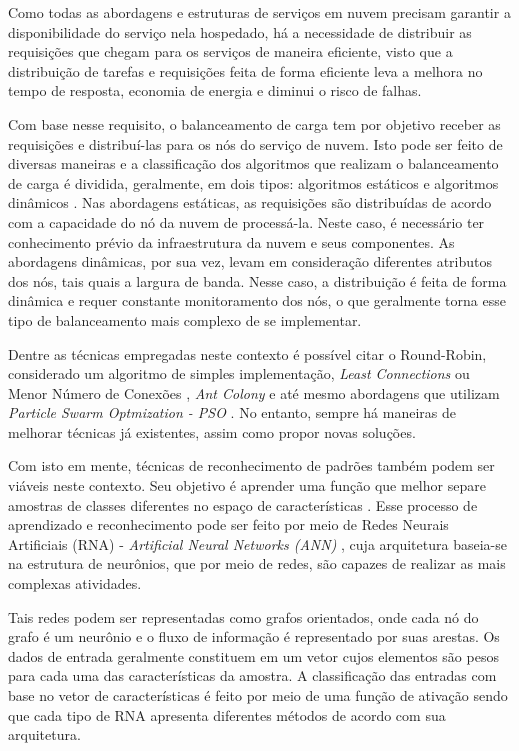 Como todas as abordagens e estruturas de serviços em nuvem precisam garantir a disponibilidade do serviço nela hospedado, há a necessidade de distribuir as requisições que chegam para os serviços de maneira eficiente, visto que a distribuição de tarefas e requisições feita de forma eficiente leva a melhora no tempo de resposta, economia de energia e diminui o risco de falhas. 

Com base nesse requisito, o balanceamento de carga tem por objetivo receber as requisições e distribuí-las para os nós do serviço de nuvem. Isto pode ser feito de diversas maneiras e a classificação dos algoritmos que realizam o balanceamento de carga é dividida, geralmente, em dois tipos: algoritmos estáticos e algoritmos dinâmicos \cite{surveycloud:2012}. Nas abordagens estáticas, as requisições são distribuídas de acordo com a capacidade do nó da nuvem de processá-la. Neste caso, é necessário ter conhecimento prévio da infraestrutura da nuvem e seus componentes. As abordagens dinâmicas, por sua vez, levam em consideração diferentes atributos dos nós, tais quais a largura de banda. Nesse caso, a distribuição é feita de forma dinâmica e requer constante monitoramento dos nós, o que geralmente torna esse tipo de balanceamento mais complexo de se implementar. 

Dentre as técnicas empregadas neste contexto é possível citar o Round-Robin, considerado um algoritmo de simples implementação, \textit{Least Connections} ou Menor Número de Conexões \cite{nginx}, \textit{Ant Colony} e até mesmo abordagens que utilizam \textit{Particle Swarm Optmization - PSO} \cite{pandey2010particle}. No entanto, sempre há maneiras de melhorar técnicas já existentes, assim como propor novas soluções.  

Com isto em mente, técnicas de reconhecimento de padrões também podem ser viáveis neste contexto. Seu objetivo é aprender uma função que melhor separe amostras de classes diferentes no espaço de características \cite{Duda:00}. Esse processo de aprendizado e reconhecimento pode ser feito por meio de Redes Neurais Artificiais (RNA) - \textit{Artificial Neural Networks (ANN)}  \cite{Haykin:07}, cuja arquitetura baseia-se na estrutura de neurônios, que por meio de redes, são capazes de realizar as mais complexas atividades. 

Tais redes podem ser representadas como grafos orientados, onde cada nó do grafo é um neurônio e o fluxo de informação é representado por suas arestas.%
Os dados de entrada geralmente constituem em um vetor cujos elementos são pesos para cada uma das características da amostra.  A classificação das entradas com base no vetor de características é feito por meio de uma função de ativação sendo que cada tipo de RNA apresenta diferentes métodos de acordo com sua arquitetura. 

